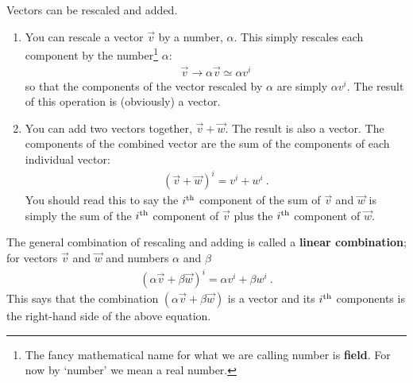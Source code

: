 \documentclass[12pt, oneside]{report}    %
\begin{document}
\begin{newrule}\label{rule:vector:linear:combinations}
Vectors can be rescaled and added.
\begin{enumerate}
    \item You can rescale a vector $\vec{v}$ by a number, $\alpha$. This simply rescales each component by the number\footnote{The fancy mathematical name for what we are calling number is \textbf{field}. For now by `number' we mean a real number.} $\alpha$:
    \begin{align}
        \vec{v} \to \alpha\vec{v} \simeq \alpha v^i
    \end{align}
    so that the components of the vector rescaled by $\alpha$ are simply $\alpha v^i$. The result of this operation is (obviously) a vector.
    \item You can add two vectors together, $\vec{v} + \vec{w}$. The result is also a vector. The components of the combined vector are the sum of the components of each individual vector:
    \begin{align}
        (\vec{v}+\vec{w})^i = v^i + w^i \ . \label{eq:vector:addition:rulex}
    \end{align}
    You should read this to say the $i^\textnormal{th}$ component of the sum of $\vec{v}$ and $\vec{w}$ is simply the sum of the $i^\textnormal{th}$ component of $\vec{v}$ plus the $i^\textnormal{th}$ component of $\vec{w}$.
\end{enumerate}
The general combination of rescaling and adding is called a \textbf{linear combination}; for vectors $\vec{v}$ and $\vec{w}$ and numbers $\alpha$ and $\beta$
\begin{align}
    (\alpha \vec{v} + \beta\vec{w})^i = \alpha v^i + \beta w^i \ .
\end{align}
This says that the combination $(\alpha\vec{v}+\beta\vec{w})$ is a vector and its $i^\textnormal{th}$ components is the right-hand side of the above equation.
\end{newrule}
\end{document}
